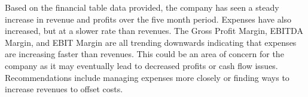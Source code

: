 

Based on the financial table data provided, the company has seen a steady increase in revenue and profits over the five month period. Expenses have also increased, but at a slower rate than revenues. The Gross Profit Margin, EBITDA Margin, and EBIT Margin are all trending downwards indicating that expenses are increasing faster than revenues. This could be an area of concern for the company as it may eventually lead to decreased profits or cash flow issues. Recommendations include managing expenses more closely or finding ways to increase revenues to offset costs.